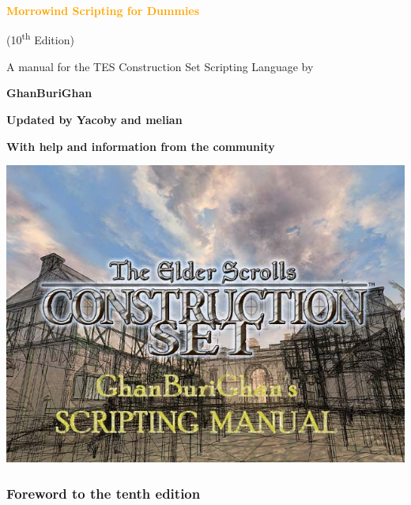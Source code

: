 \documentclass[oneside]{article}
\begin{document}

\begin{center}
	{\Huge \textcolor{orange}{\textbf{Morrowind Scripting for Dummies}}}
	
	\vspace{5mm}
	
	{\LARGE (10\textsuperscript{th} Edition)}
	
	\vspace{5mm}
	
	{\Large A manual for the TES Construction Set Scripting Language by
		
	\vspace{5mm}	
	
	\textbf{GhanBuriGhan}
	
	\textbf{Updated by Yacoby and melian}}

	{\large \textbf{With help and information from the community}}
\end{center}

\vspace{5mm}

\includegraphics{media/image1.jpg}

\clearpage

\tableofcontents
{}

\hypertarget{foreword-to-the-tenth-edition}{%
\subsubsection{\texorpdfstring{\hfill\break
Foreword to the tenth edition}{Foreword to the ninth edition}}\label{foreword-to-the-tenth-edition}}
\end{document}
